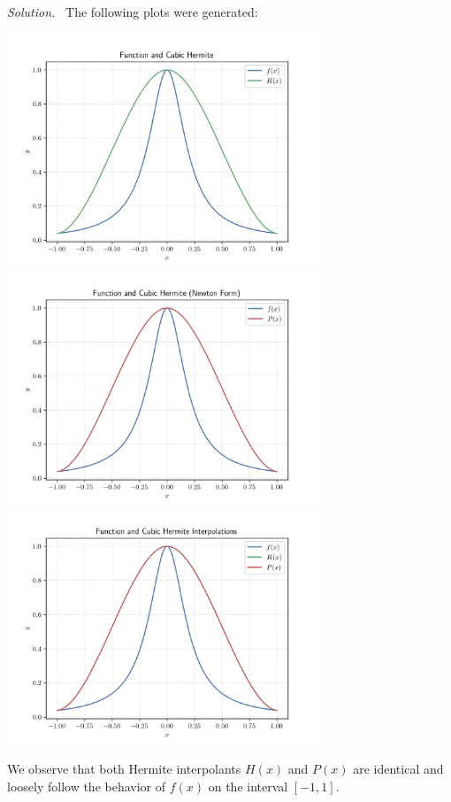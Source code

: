 \documentclass[12pt]{article}
\newcommand{\solution}
    {\par\vspace{0.5em}\noindent\emph{Solution.}\ }
    {\par\vspace{1em}}
\begin{document}
\solution
The following plots were generated:
\begin{center}
\includegraphics[width=0.7\textwidth]{../outputs_3/hermite_plot_h.png}
\includegraphics[width=0.7\textwidth]{../outputs_3/hermite_plot_p.png}
\includegraphics[width=0.7\textwidth]{../outputs_3/hermite_plot.png}
\end{center}

We observe that both Hermite interpolants $H(x)$ and $P(x)$ are identical and loosely follow the behavior of $f(x)$ on the interval $[-1,1]$.
\end{document}
